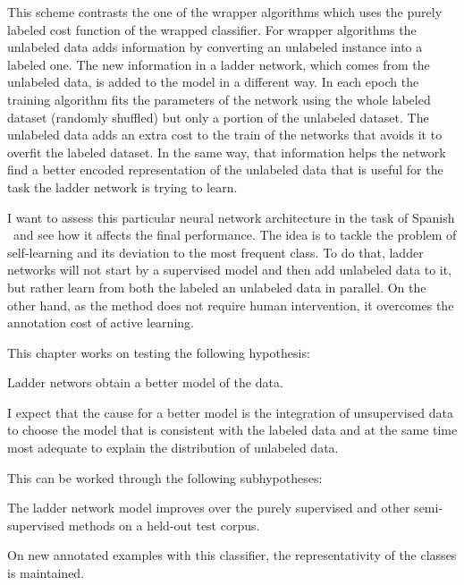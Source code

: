 This scheme contrasts the one of the wrapper algorithms which uses the purely
labeled cost function of the wrapped classifier. For wrapper algorithms the
unlabeled data adds information by converting an unlabeled instance into a
labeled one. The new information in a ladder network, which comes from the
unlabeled data, is added to the model in a different way. In each epoch the
training algorithm fits the parameters of the network using the whole labeled
dataset (randomly shuffled) but only a portion of the unlabeled dataset. The
unlabeled data adds an extra cost to the train of the networks that avoids it
to overfit the labeled dataset. In the same way, that information helps the
network find a better encoded representation of the unlabeled data that is
useful for the task the ladder network is trying to learn.

I want to assess this particular neural network architecture in the task of
Spanish \vsd~and see how it affects the final performance. The idea is to
tackle the problem of self-learning and its deviation to the most frequent
class. To do that, ladder networks will not start by a supervised model and
then add unlabeled data to it, but rather learn from both the labeled an
unlabeled data in parallel. On the other hand, as the method does not require
human intervention, it overcomes the annotation cost of active learning.

This chapter works on testing the following hypothesis:

\begin{hypothesis}\label{hyp:ladder}
  Ladder networs obtain a better model of the data.
\end{hypothesis}

I expect that the cause for a better model is the integration of unsupervised
data to choose the model that is consistent with the labeled data and at the
same time most adequate to explain the distribution of unlabeled data.

This can be worked through the following subhypotheses:

\begin{subhypothesis}\label{hyp:ladder:1}
  The ladder network model improves over the purely supervised and other
  semi-supervised methods on a held-out test corpus.
\end{subhypothesis}

\begin{subhypothesis}\label{hyp:ladder:2}
  On new annotated examples with this classifier, the representativity of the
  classes is maintained.
\end{subhypothesis}

